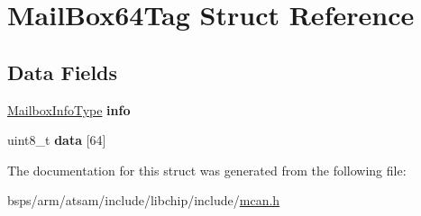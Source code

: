 \hypertarget{structMailBox64Tag}{}\section{Mail\+Box64\+Tag Struct Reference}
\label{structMailBox64Tag}
\subsection*{Data Fields}
\begin{DoxyCompactItemize}
\item 
\mbox{\label{structMailBox64Tag_acd4000138ad9942c516797108135f1a1}} 
\mbox{\hyperlink{structMailboxInfoTag}{Mailbox\+Info\+Type}} {\bfseries info}
\item 
\mbox{\label{structMailBox64Tag_a1d635244865e1e75bf6aeab031139487}} 
uint8\+\_\+t {\bfseries data} \mbox{[}64\mbox{]}
\end{DoxyCompactItemize}


The documentation for this struct was generated from the following file\+:\begin{DoxyCompactItemize}
\item 
bsps/arm/atsam/include/libchip/include/\mbox{\hyperlink{mcan_8h}{mcan.\+h}}\end{DoxyCompactItemize}

